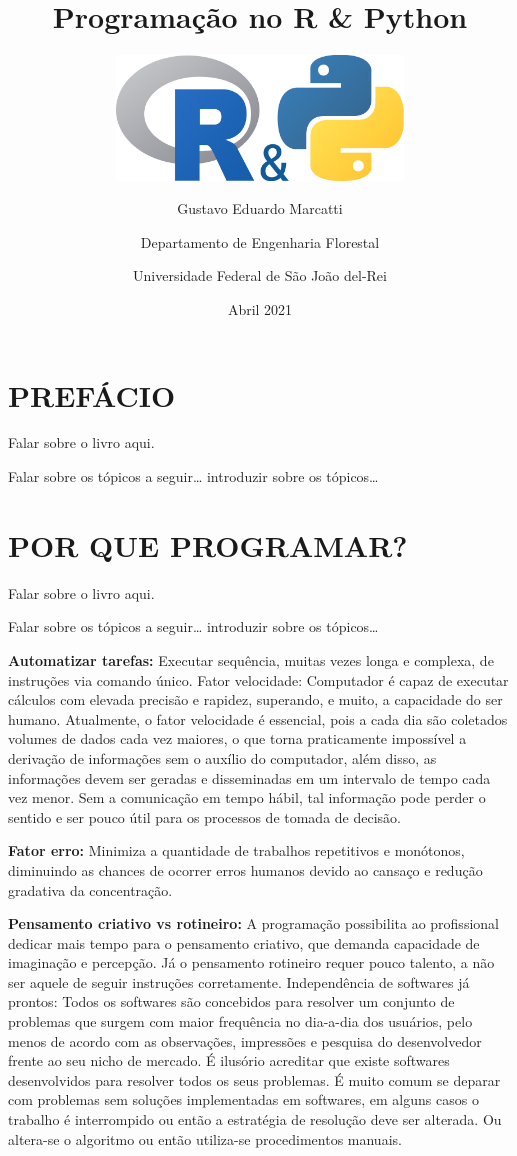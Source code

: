 \documentclass[
  11pt,
  a5paper,
  openany]{book}
\title{Programação no R \& Python}
\subtitle{\includegraphics[width=3in,height=\textheight]{images/logo.png}}
\author{Gustavo Eduardo Marcatti \and Departamento de Engenharia Florestal \and Universidade Federal de São João del-Rei}
\date{Abril 2021}
\begin{document}
\maketitle

{
\setcounter{tocdepth}{1}
\tableofcontents
}
\renewcommand{\figurename}{Figura}
\renewcommand{\tablename}{Tabela}
\renewcommand{\contentsname}{SUMÁRIO}

\hypertarget{prefuxe1cio}{%
\chapter*{PREFÁCIO}\label{prefuxe1cio}}

Falar sobre o livro aqui.

Falar sobre os tópicos a seguir\ldots{} introduzir sobre os tópicos\ldots{}

\hypertarget{por-que-programar}{%
\chapter{POR QUE PROGRAMAR?}\label{por-que-programar}}

Falar sobre o livro aqui.

Falar sobre os tópicos a seguir\ldots{} introduzir sobre os tópicos\ldots{}

\textbf{Automatizar tarefas:} Executar sequência, muitas vezes longa e complexa, de instruções via comando único.
Fator velocidade: Computador é capaz de executar cálculos com elevada precisão e rapidez, superando, e muito, a capacidade do ser humano. Atualmente, o fator velocidade é essencial, pois a cada dia são coletados volumes de dados cada vez maiores, o que torna praticamente impossível a derivação de informações sem o auxílio do computador, além disso, as informações devem ser geradas e disseminadas em um intervalo de tempo cada vez menor. Sem a comunicação em tempo hábil, tal informação pode perder o sentido e ser pouco útil para os processos de tomada de decisão.

\textbf{Fator erro:} Minimiza a quantidade de trabalhos repetitivos e monótonos, diminuindo as chances de ocorrer erros humanos devido ao cansaço e redução gradativa da concentração.

\textbf{Pensamento criativo vs rotineiro:} A programação possibilita ao profissional dedicar mais tempo para o pensamento criativo, que demanda capacidade de imaginação e percepção. Já o pensamento rotineiro requer pouco talento, a não ser aquele de seguir instruções corretamente.
Independência de softwares já prontos: Todos os softwares são concebidos para resolver um conjunto de problemas que surgem com maior frequência no dia-a-dia dos usuários, pelo menos de acordo com as observações, impressões e pesquisa do desenvolvedor frente ao seu nicho de mercado. É ilusório acreditar que existe softwares desenvolvidos para resolver todos os seus problemas. É muito comum se deparar com problemas sem soluções implementadas em softwares, em alguns casos o trabalho é interrompido ou então a estratégia de resolução deve ser alterada. Ou altera-se o algoritmo ou então utiliza-se procedimentos manuais.
\end{document}
